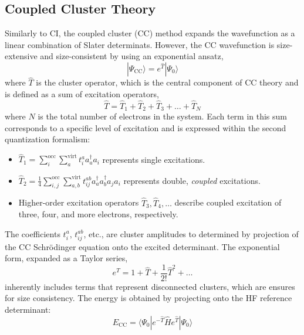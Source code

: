 \subsection{Coupled Cluster Theory} \label{sec:CCTheory}
Similarly to CI, the coupled cluster (CC)\cite{shavitt2009many,vcivzek1966correlation,vcivzek1969use,monkhorst1977calculation,raghavachari1989fifth} method expands the wavefunction as a linear combination of Slater determinats. However, the CC wavefunction is size-extensive and size-consistent by using an exponential ansatz,
\begin{equation}\label{eq:CCWavenfunc}
    | \Psi_{\mathrm{CC}} \rangle = e^{\hat{T}} | \Psi_{0} \rangle
\end{equation}
where $\hat{T}$ is the cluster operator, which is the central component of CC theory and is defined as a sum of excitation operators,
\begin{equation}
    \hat{T} = \hat{T}_1 + \hat{T}_2 + \hat{T}_3 + \dots + \hat{T}_N
\end{equation}
where $N$ is the total number of electrons in the system. Each term in this sum corresponds to a specific level of excitation and is expressed within the second quantization formalism:
\begin{itemize}
    \item $\hat{T}_1 = \sum_{i}^{\text{occ}} \sum_{a}^{\text{virt}} t_i^a a_a^{\dagger} a_i$ represents single excitations.
    \item $\hat{T}_2 = \frac{1}{4} \sum_{i,j}^{\text{occ}} \sum_{a,b}^{\text{virt}} t_{ij}^{ab} a_a^{\dagger} a_b^{\dagger} a_j a_i$ represents double, \textit{coupled} excitations.
    \item Higher-order excitation operators $\hat{T}_3, \hat{T}_4, \dots$ describe coupled excitation of three, four, and more electrons, respectively.
\end{itemize}
The coefficients $t_i^a$, $t_{ij}^{ab}$, etc., are cluster amplitudes to determined by projection of the CC Schr\"{o}dinger equation onto the excited determinant. The exponential form, expanded as a Taylor series,
\begin{equation}
    e^{\hat{T}} = 1 + \hat{T} + \frac{1}{2!} \hat{T}^2 + \dots
\end{equation}
inherently includes terms that represent disconnected clusters, which are ensures for size consistency. The energy is obtained by projecting onto the HF reference determinant:
\begin{equation}\label{eq:CCEnergy}
    E_{\mathrm{CC}}=\langle \Psi_{0} | e^{-\hat{T}} \hat{H} e^{\hat{T}} | \Psi_{0} \rangle
\end{equation}
